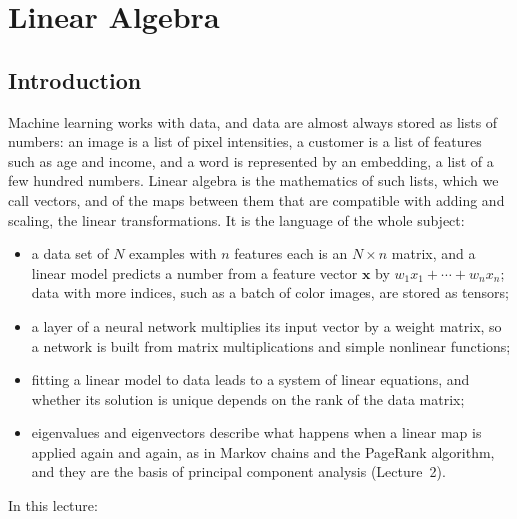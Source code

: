 \chapter{Linear Algebra}\label{L1-chapter}
\begingroup
\section*{Introduction}

Machine learning works with data, and data are almost always stored as lists of numbers: an image is a list of pixel intensities, a customer is a list of features such as age and income, and a word is represented by an embedding, a list of a few hundred numbers. Linear algebra is the mathematics of such lists, which we call vectors, and of the maps between them that are compatible with adding and scaling, the linear transformations. It is the language of the whole subject:
\begin{itemize}
    \item a data set of $N$ examples with $n$ features each is an $N \times n$ matrix, and a linear model predicts a number from a feature vector $\mathbf{x}$ by $w_1x_1 + \cdots + w_nx_n$; data with more indices, such as a batch of color images, are stored as tensors;
    \item a layer of a neural network multiplies its input vector by a weight matrix, so a network is built from matrix multiplications and simple nonlinear functions;
    \item fitting a linear model to data leads to a system of linear equations, and whether its solution is unique depends on the rank of the data matrix;
    \item eigenvalues and eigenvectors describe what happens when a linear map is applied again and again, as in Markov chains and the PageRank algorithm, and they are the basis of principal component analysis (Lecture~2).
\end{itemize}
In this lecture:
